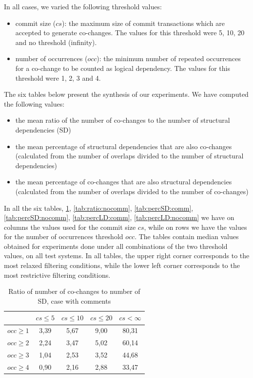 \documentclass[12pt, a4paper, twoside]{report}
\begin{document}
In all cases, we varied the following threshold values: 
 \begin{itemize}
	\item commit size ($cs$): the maximum size of commit transactions which are accepted to generate co-changes. The values for this threshold were 5, 10, 20 and no threshold (infinity).  
	\item number of occurrences ($occ$): the minimum number of repeated occurrences for a co-change to be counted as logical dependency. The values for this threshold were 1, 2, 3 and 4.  
\end{itemize}

The six tables below present the synthesis of our experiments. 
We have computed the following  values:
\begin{itemize}
	\item the mean ratio of the number of co-changes to the number of structural dependencies (SD)
   	\item the mean percentage of structural dependencies that are also co-changes (calculated from the number of overlaps divided to the number of structural dependencies)	
	\item the mean percentage of co-changes that are also structural dependencies (calculated from the number of overlaps divided to the number of co-changes)
\end{itemize}

In all the six tables, \ref{tab:ratio:comm}, \ref{tab:ratio:nocomm}, \ref{tab:percSD:comm}, \ref{tab:percSD:nocomm},
\ref{tab:percLD:comm}, \ref{tab:percLD:nocomm} we have on columns the values used for the commit size $cs$, while on rows we have the values for the number of occurrences threshold $occ$. The tables contain median values obtained for experiments done under all combinations of the two threshold values, on all test systems. In all tables, the upper right corner corresponds to the most relaxed filtering conditions, while the lower left corner corresponds to the most restrictive filtering conditions.

\begin{table}[!h]
\renewcommand{\arraystretch}{1}
\caption{Ratio of number of co-changes to number of SD, case with comments}
\label{tab:ratio:comm}
\centering

\begin{tabular}{|c|c|c|c|c|}
\hline
	      &	$cs\leq 5$	&	$cs\leq 10$	&	$cs\leq 20$	&	$cs<\infty$	\\
\hline
$occ\geq 1$	&	3,39	&	5,67	&	9,00	&	80,31	\\
$occ\geq 2$	&	2,24	&	3,47	&	5,02	&	60,14	\\
$occ\geq 3$	&	1,04	&	2,53	&	3,52	&	44,68	\\
$occ\geq 4$	&	0,90	&	2,16	&	2,88	&	33,47	\\
\hline
\end{tabular}
\end{table}
\end{document}
